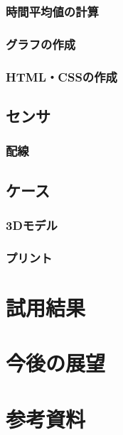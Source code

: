 \documentclass[a4paper]{jsarticle}
\begin{document}
\subsubsection{時間平均値の計算}
\subsubsection{グラフの作成}
\subsubsection{HTML・CSSの作成}
\subsection{センサ}
\subsubsection{配線}
\subsection{ケース}
\subsubsection{3Dモデル}
\subsubsection{プリント}
\section{試用結果}
\section{今後の展望}
\section{参考資料}
\end{document}
